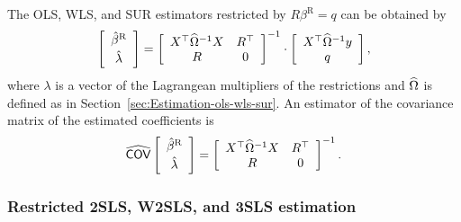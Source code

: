 The OLS, WLS, and SUR estimators restricted by $R \beta^\text{R} = q$ can be obtained by
\begin{equation}
   \left[ \begin{array}{c}
      \hat{\beta}^\text{R} \\[0.2em] \hat{\lambda}
   \end{array} \right]
   =
   \left[ \begin{array}{cc}
      X^\top \widehat{\Omega}^{-1} X & R^\top \\
      R & 0
   \end{array} \right]^{-1}
   \cdot
   \left[ \begin{array}{c}
      X^\top \widehat{\Omega}^{-1} y \\ q
   \end{array} \right] ,
   \label{eq:ols-wls-sur-r}
\end{equation}
where $\lambda$ is a vector of the Lagrangean multipliers of the restrictions
and $\widehat{\Omega}$ is defined as in Section~\ref{sec:Estimation-ols-wls-sur}.
An estimator of the covariance matrix of the estimated coefficients is
\begin{equation}
   \widehat{\mathsf{COV}}
   \left[ \begin{array}{c}
      \hat{\beta}^\text{R} \\[0.2em] \hat{\lambda}
   \end{array} \right] 
   = 
   \left[ \begin{array}{cc}
      X^\top \widehat{\Omega}^{-1} X & R^\top \\
      R & 0
   \end{array} \right]^{-1} .
   \label{eq:cov-ols-wls-sur-r}
\end{equation}

\subsubsection{Restricted 2SLS, W2SLS, and 3SLS estimation}

